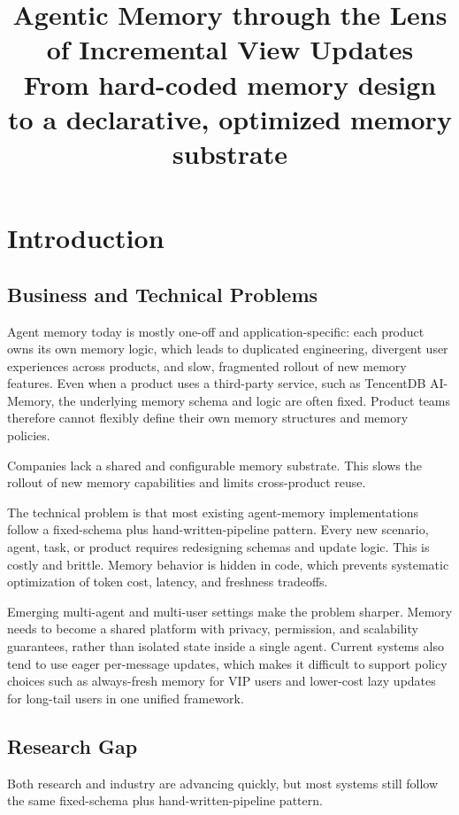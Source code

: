 \documentclass[11pt]{article}
\title{Agentic Memory through the Lens of Incremental View Updates\\
\large From hard-coded memory design to a declarative, optimized memory substrate}
\begin{document}
\maketitle

\section{Introduction}

\subsection{Business and Technical Problems}

Agent memory today is mostly one-off and application-specific: each product
owns its own memory logic, which leads to duplicated engineering, divergent
user experiences across products, and slow, fragmented rollout of new memory
features. Even when a product uses a third-party service, such as TencentDB
AI-Memory, the underlying memory schema and logic are often fixed. Product
teams therefore cannot flexibly define their own memory structures and memory
policies.

Companies lack a shared and configurable memory substrate. This slows the
rollout of new memory capabilities and limits cross-product reuse.

The technical problem is that most existing agent-memory implementations follow
a fixed-schema plus hand-written-pipeline pattern. Every new scenario, agent,
task, or product requires redesigning schemas and update logic. This is costly
and brittle. Memory behavior is hidden in code, which prevents systematic
optimization of token cost, latency, and freshness tradeoffs.

Emerging multi-agent and multi-user settings make the problem sharper. Memory
needs to become a shared platform with privacy, permission, and scalability
guarantees, rather than isolated state inside a single agent. Current systems
also tend to use eager per-message updates, which makes it difficult to support
policy choices such as always-fresh memory for VIP users and lower-cost lazy
updates for long-tail users in one unified framework.

\subsection{Research Gap}

Both research and industry are advancing quickly, but most systems still follow
the same fixed-schema plus hand-written-pipeline pattern.
\end{document}
